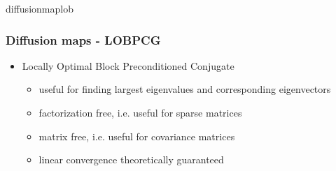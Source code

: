 \documentclass[xcolor=x11names,compress]{beamer}
\begin{document}
\begin{frame}{diffusionmaplob}
    \frametitle{Diffusion maps - LOBPCG}

    \begin{itemize}
        \item<2-> Locally Optimal Block Preconditioned Conjugate
            \begin{itemize}[label=-]
                \item<3-> useful for finding largest eigenvalues and corresponding eigenvectors
                \item<3-> factorization free, i.e. useful for sparse matrices
                \item<4-> matrix free, i.e. useful for covariance matrices
                \item<5-> linear convergence theoretically guaranteed
            \end{itemize}


    \end{itemize}
\end{frame}
\end{document}
